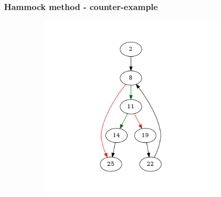 \documentclass[aspectratio=1610]{beamer}
\begin{document}
\begin{frame}
	\frametitle{Hammock method - counter-example}
	\begin{figure}[htbp]
		\centering
		\begin{subfigure}[b]{0.50\textwidth}
			\centering
			\includegraphics[height=0.6\paperheight]{inc/methods/hammock/counter-example/with-break/main.png}
		\end{subfigure}
	\end{figure}
\end{frame}
\end{document}
